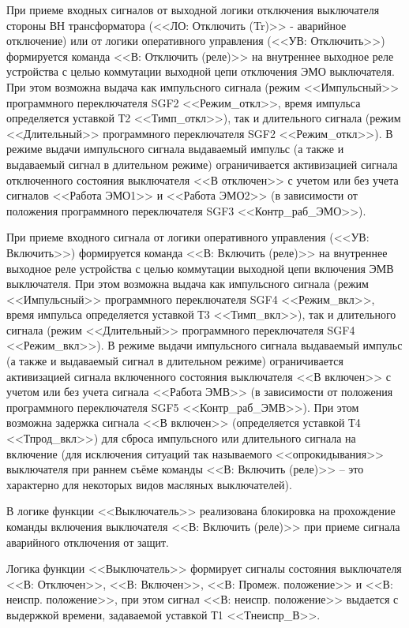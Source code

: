 \par
При приеме входных сигналов от выходной логики отключения выключателя стороны ВН трансформатора (<<ЛО: Отключить (Tr)>> - аварийное отключение) или от логики оперативного управления (<<УВ: Отключить>>) формируется команда <<В: Отключить (реле)>> на внутреннее выходное реле устройства с целью коммутации выходной цепи отключения ЭМО выключателя. При этом возможна выдача как импульсного сигнала (режим <<Импульсный>> программного переключателя SGF2 <<Режим\_откл>>, время импульса определяется уставкой Т2 <<Тимп\_откл>>), так и длительного сигнала (режим <<Длительный>> программного переключателя SGF2 <<Режим\_откл>>). 
В режиме выдачи импульсного сигнала выдаваемый импульс (а также и выдаваемый сигнал в длительном режиме) ограничивается активизацией сигнала отключенного состояния выключателя <<В отключен>> с учетом или без учета сигналов <<Работа ЭМО1>> и <<Работа ЭМО2>> (в зависимости от положения программного переключателя SGF3 <<Контр\_раб\_ЭМО>>).

\par
При приеме входного сигнала от логики оперативного управления (<<УВ: Включить>>) формируется команда <<В: Включить (реле)>> на внутреннее выходное реле устройства с целью коммутации выходной цепи включения ЭМВ выключателя. При этом возможна выдача как импульсного сигнала (режим <<Импульсный>> программного переключателя SGF4 <<Режим\_вкл>>, время импульса определяется уставкой Т3 <<Тимп\_вкл>>), так и длительного сигнала (режим <<Длительный>> программного переключателя SGF4 <<Режим\_вкл>>).
В режиме выдачи импульсного сигнала выдаваемый импульс (а также и выдаваемый сигнал в длительном режиме) ограничивается активизацией сигнала включенного состояния выключателя <<В включен>> с учетом или без учета сигнала <<Работа ЭМВ>> (в зависимости от положения программного переключателя SGF5 <<Контр\_раб\_ЭМВ>>). При этом возможна задержка сигнала <<В включен>> (определяется уставкой Т4 <<Тпрод\_вкл>>) для сброса импульсного или длительного сигнала на включение (для исключения ситуаций так называемого <<опрокидывания>> выключателя при раннем съёме команды <<В: Включить (реле)>> -- это характерно для некоторых видов масляных выключателей).

\par
В логике функции <<Выключатель>> реализована блокировка на прохождение команды включения выключателя <<В: Включить (реле)>> при приеме сигнала аварийного отключения от защит.

\par
Логика функции <<Выключатель>> формирует сигналы состояния выключателя <<В: Отключен>>, <<В: Включен>>, <<В: Промеж. положение>> и <<В: неиспр. положение>>, при этом сигнал <<В: неиспр. положение>> выдается с выдержкой времени, задаваемой уставкой Т1 <<Тнеиспр\_В>>.

